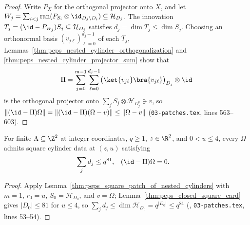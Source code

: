 \begin{proof}
    \leanok
    Write $P_X$ for the orthogonal projector onto $X$, and let
    $W_j=\sum_{i<j}\operatorname{ran}(P_{S_i}\otimes\id_{D_j\setminus D_i})\subseteq\mathcal H_{D_j}$.
    The innovation $T_j=(\id-P_{W_j})S_j\subseteq\mathcal H_{D_j}$ satisfies
    $d_j=\dim T_j\le\dim S_j$. Choosing an orthonormal basis
    $(v_{j\ell})_{\ell=0}^{d_j-1}$ of each $T_j$, Lemmas~\ref{thm:peps_nested_cylinder_orthogonalization}
    and \ref{thm:peps_nested_cylinder_projector_sum} show that
    \begin{align}
        \Pi=\sum_{j=0}^{m-1}\sum_{\ell=0}^{d_j-1}
        \bigl(\ket{v_{j\ell}}\bra{v_{j\ell}}\bigr)_{D_j}\otimes\id \notag
    \end{align}
    is the orthogonal projector onto $\sum_j S_j\otimes\mathcal H_{D_j^c}\ni v$,
    so $\lVert(\id-\Pi)\Omega\rVert=\lVert(\id-\Pi)(\Omega-v)\rVert\le\lVert\Omega-v\rVert$
    (\texttt{03-patches.tex}, lines 563--603).
\end{proof}

\begin{lemma}
    \label{thm:peps_bounded_radius_square_patch}
    \leanok
    For finite $\Lambda\subseteq\Z^2$ at integer coordinates, $q\ge1$,
    $z\in\R^2$, and $0<u\le4$, every $\Omega$ admits square cylinder data at
    $(z,u)$ satisfying
    \begin{align}
        \sum_jd_j & \le q^{81}, & (\id-\Pi)\Omega & =0. \notag
    \end{align}
\end{lemma}

\begin{proof}
    \leanok
    Apply Lemma~\ref{thm:peps_square_patch_of_nested_cylinders} with $m=1$,
    $r_0=u$, $S_0=\mathcal H_{D_0}$, and $v=\Omega$; Lemma~\ref{thm:peps_closed_square_card}
    gives $|D_0|\le81$ for $u\le4$, so $\sum_jd_j\le\dim\mathcal H_{D_0}=q^{|D_0|}\le q^{81}$
    (\cite{OpenAI2026PolynomialPEPS}, \texttt{03-patches.tex}, lines 53--54).
\end{proof}

